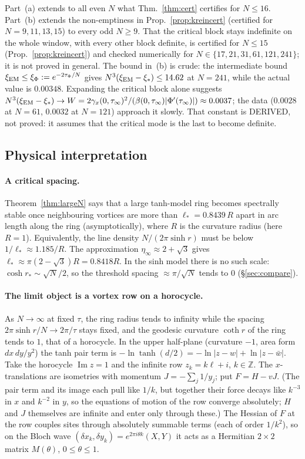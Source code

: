 \documentclass[11pt]{article}
\theoremstyle{remark}
\begin{document}
Part~(a) extends to all even $N$ what Thm.~\ref{thm:cert} certifies for $N\le16$. Part~(b) extends the non-emptiness in
Prop.~\ref{prop:kreincert} (certified for $N=9,11,13,15$) to every odd $N\ge9$. That the critical block stays indefinite on the
whole window, with every other block definite, is certified for $N\le15$ (Prop.~\ref{prop:kreincert}) and checked numerically
for $N\in\{17,21,31,61,121,241\}$; it is not proved in general. The bound in~(b) is crude: the intermediate bound
$\xi_{\rm EM}\le\xi_\Phi:=e^{-2\tau_\Phi/N}$ gives $N^3(\xi_{\rm EM}-\xi_*)\le14.62$ at $N=241$, while the actual value is $0.00348$. Expanding the critical block alone
suggests $N^3(\xi_{\rm EM}-\xi_*)\to W=2\gamma_x(0,\tau_\infty)^2/(\beta(0,\tau_\infty)|\Phi'(\tau_\infty)|)\approx0.0037$; the data
($0.0028$ at $N=61$, $0.0032$ at $N=121$) approach it slowly. That constant is DERIVED, not proved: it assumes that the
critical mode is the last to become definite.

\subsection*{Physical interpretation}
\paragraph{A critical spacing.} Theorem~\ref{thm:largeN} says that a large tanh-model ring becomes spectrally stable once
neighbouring vortices are more than $\ell_*=0.8439\,R$ apart in arc length along the ring (asymptotically), where $R$ is the curvature radius (here
$R=1$). Equivalently, the line density $N/(2\pi\sinh r)$ must be below $1/\ell_*\approx1.185/R$. The approximation
$\eta_\infty\approx2+\sqrt3$ gives $\ell_*\approx\pi(2-\sqrt3)R=0.8418R$. In the sinh model there is no such scale:
$\cosh r_*\sim\sqrt N/2$, so the threshold spacing $\approx\pi/\sqrt N$ tends to $0$ (\S\ref{sec:compare}).

\paragraph{The limit object is a vortex row on a horocycle.} As $N\to\infty$ at fixed $\tau$, the ring radius tends to
infinity while the spacing $2\pi\sinh r/N\to2\pi/\tau$ stays fixed, and the geodesic curvature $\coth r$ of the ring
tends to $1$, that of a horocycle. In the upper half-plane (curvature $-1$, area form $dx\,dy/y^2$) the tanh pair term is
$-\ln\tanh(d/2)=-\ln|z-w|+\ln|z-\bar w|$. Take the horocycle $\operatorname{Im}z=1$ and the infinite row $z_k=k\ell+i$,
$k\in\mathbb Z$. The $x$-translations are isometries with momentum $J=-\sum_j1/y_j$; put $F=H-vJ$. (The pair term and its
image each pull like $1/k$, but together their force decays like $k^{-3}$ in $x$ and $k^{-2}$ in $y$, so the equations of
motion of the row converge absolutely; $H$ and $J$ themselves are infinite and enter only through these.) The Hessian of $F$ at the
row couples sites through absolutely summable terms (each of order $1/k^2$), so on the Bloch wave
$(\delta x_k,\delta y_k)=e^{2\pi i\theta k}(X,Y)$ it acts as a Hermitian $2\times2$ matrix $M(\theta)$, $0\le\theta\le1$.
\end{document}
